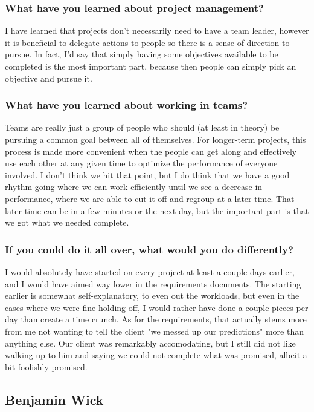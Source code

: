 \documentclass[onecolumn, draftclsnofoot,10pt, compsoc]{IEEEtran}
\begin{document}
\subsubsection{What have you learned about project management?}
I have learned that projects don't necessarily need to have a team leader, however it is beneficial to delegate actions to people so there is a sense of direction to pursue.  In fact, I'd say that simply having some objectives available to be completed is the most important part, because then people can simply pick an objective and pursue it.

\subsubsection{What have you learned about working in teams?}
Teams are really just a group of people who should (at least in theory) be pursuing a common goal between all of themselves.  For longer-term projects, this process is made more convenient when the people can get along and effectively use each other at any given time to optimize the performance of everyone involved.  I don't think we hit that point, but I do think that we have a good rhythm going where we can work efficiently until we see a decrease in performance, where we are able to cut it off and regroup at a later time.  That later time can be in a few minutes or the next day, but the important part is that we got what we needed complete.

\subsubsection{If you could do it all over, what would you do differently?}
I would absolutely have started on every project at least a couple days earlier, and I would have aimed way lower in the requirements documents.  The starting earlier is somewhat self-explanatory, to even out the workloads, but even in the cases where we were fine holding off, I would rather have done a couple pieces per day than create a time crunch.  As for the requirements, that actually stems more from me not wanting to tell the client "we messed up our predictions" more than anything else.  Our client was remarkably accomodating, but I still did not like walking up to him and saying we could not complete what was promised, albeit a bit foolishly promised.


\subsection{Benjamin Wick}
\end{document}
